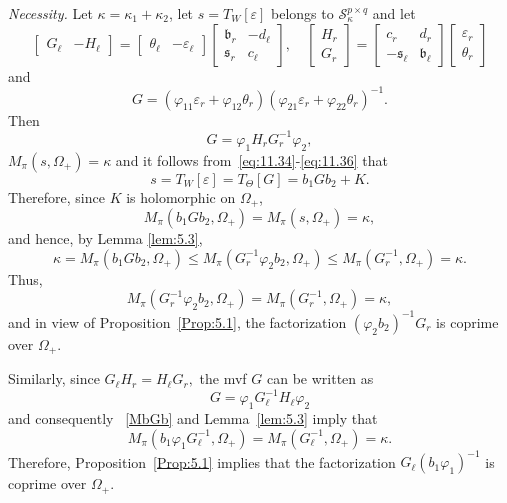 \documentclass[12pt,twoside,a4paper]{amsart}
\theoremstyle{definition}
\numberwithin{equation}{section}
\begin{document}
 {\it Necessity.} Let
$\kappa=\kappa_1+\kappa_2$, let $s=T_W[\varepsilon]$
belongs to ${\mathcal S}_{\kappa}^{p\times q}$ and
let
\begin{equation}
\label{eq:may13a9}
\begin{bmatrix}G_\ell&-H_\ell\end{bmatrix}=
\begin{bmatrix}\theta_\ell&-\varepsilon_\ell\end{bmatrix}
\begin{bmatrix}{{\mathfrak b}}_r&-d_\ell\\{{\mathfrak s}}_r&c_\ell\end{bmatrix},\quad
\begin{bmatrix}H_r\\ G_r\end{bmatrix}=\begin{bmatrix}c_r&d_r\\-{{\mathfrak s}}_\ell
&{{\mathfrak b}}_\ell
\end{bmatrix}\begin{bmatrix}\varepsilon_r\\ \theta_r\end{bmatrix}
\end{equation}
and
\begin{equation}\label{G}
    G=(\varphi_{11}\varepsilon_r+\varphi_{12}\theta_r)
     (\varphi_{21}\varepsilon_r+\varphi_{22}\theta_r)^{-1}.
\end{equation}
Then
$$
G=\varphi_1 H_rG_r^{-1}\varphi_2,
$$
$M_\pi(s, \Omega_+)=\kappa$ and it follows
from~\eqref{eq:11.34}-\eqref{eq:11.36} that
\begin{equation}\label{eq:10.3}
s=T_W[\varepsilon]=T_\Theta[G]=b_1Gb_2+K.
\end{equation}
Therefore, since $K$ is holomorphic on $\Omega_+$,
\begin{equation}\label{MbGb}
M_\pi(b_1Gb_2,\Omega_+)=M_\pi(s,\Omega_+)=\kappa,
\end{equation}
 and  hence, by Lemma \ref{lem:5.3},
\begin{equation}\label{eq:10.5}
\kappa=M_\pi(b_1Gb_2,\Omega_+)\le M_\pi(G_r^{-1}\varphi_2b_2,\Omega_+)
\le M_\pi(G_r^{-1},\Omega_+) =\kappa.
\end{equation}
Thus,
\[
M_\pi(G_r^{-1}\varphi_2b_2,\Omega_+)=M_\pi(G_r^{-1},\Omega_+)=\kappa,
\]
and in view of  Proposition~\ref{Prop:5.1}, the factorization
$(\varphi_2b_2)^{-1}G_r$ is
coprime over $\Omega_+$.

Similarly, since
$
G_\ell H_r=H_\ell G_r,
$
the mvf $G$ can be written as
\begin{equation}\label{eq:10.7}
G=\varphi_1 G_\ell^{-1}H_\ell\varphi_2
\end{equation}
and consequently ~\eqref{MbGb} and Lemma~\ref{lem:5.3} imply that
\[
M_\pi(b_1\varphi_1 G_\ell^{-1},\Omega_+)
=M_\pi(G_\ell^{-1},\Omega_+)=\kappa.
\]
Therefore,  Proposition~\ref{Prop:5.1} implies that the
factorization
$G_\ell(b_1\varphi_1)^{-1}$
is coprime over $\Omega_+$.
\end{document}

